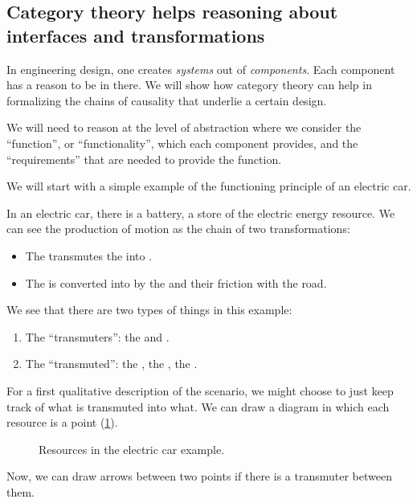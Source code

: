 \subsection{Category theory helps reasoning about interfaces and transformations}

In engineering design, one creates \emph{systems} out of \emph{components}. Each component
has a reason to be in there. We will show how category theory can help in formalizing the chains of causality 
that underlie a certain design. 

We will need to reason at the level of abstraction
where we consider the ``function'', or ``functionality'', which each component provides,
and the ``requirements'' that are needed to provide the function.

We will start with a simple example of the functioning principle of an electric car. 

In an electric car, there is a battery, a store of the electric energy resource. 
We can see the production of motion as the chain of two transformations:

\begin{itemize}
    \item The \motor transmutes the \electricpower into \rotationalmotion.
    \item The \rotationalmotion is converted into \translationalmotion by the \wheels and their friction with the road. 
\end{itemize}

We see that there are two types of things in this example:
\begin{enumerate}
    \item The ``transmuters'': the \motor and \wheels.
    \item The ``transmuted'': the \electricpower, the \rotationalmotion, the \translationalmotion.
\end{enumerate}

For a first qualitative description of the scenario, we might choose to just keep track of what is transmuted into what. We can draw a diagram in which each resource is a point (\cref{fig:e1}).

\begin{figure}[h!]
    \centering
    \caption{Resources in the electric car example. \label{fig:e1} }
\end{figure}



Now, we can draw arrows between two points if there is a transmuter between them.

